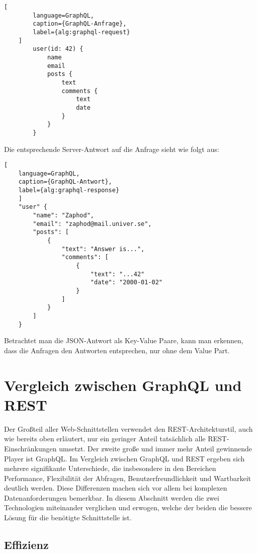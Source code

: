 \documentclass[draft,final]{vutinfth} %
\begin{document}
\begin{lstlisting}[
		language=GraphQL, 
		caption={GraphQL-Anfrage}, 
		label={alg:graphql-request}
	]
		user(id: 42) {
			name
			email
			posts {
				text
				comments {
					text
					date
				}
			}
		}
\end{lstlisting}

Die entsprechende Server-Antwort auf die Anfrage sieht wie folgt aus:

\begin{lstlisting}[
	language=GraphQL, 
	caption={GraphQL-Antwort}, 
	label={alg:graphql-response}
	]
	"user" {
		"name": "Zaphod",
		"email": "zaphod@mail.univer.se",
		"posts": [
			{
				"text": "Answer is...",
				"comments": [
					{
						"text": "...42"
						"date": "2000-01-02"
					}
				]
			}
		]
	}
\end{lstlisting}

Betrachtet man die JSON-Antwort als Key-Value Paare, kann man erkennen, dass die Anfragen den Antworten entsprechen, nur ohne dem Value Part.


\section{Vergleich zwischen GraphQL und REST}

Der Großteil aller Web-Schnittstellen verwendet den REST-Architekturstil, auch wie bereits oben erläutert, nur ein geringer Anteil tatsächlich alle REST-Einschränkungen umsetzt.
Der zweite große und immer mehr Anteil gewinnende Player ist GraphQL.
Im Vergleich zwischen GraphQL und REST ergeben sich mehrere signifikante Unterschiede, die insbesondere in den Bereichen Performance, Flexibilität der Abfragen, Benutzerfreundlichkeit und Wartbarkeit deutlich werden. 
Diese Differenzen machen sich vor allem bei komplexen Datenanforderungen bemerkbar.
In diesem Abschnitt werden die zwei Technologien miteinander verglichen und erwogen, welche der beiden die bessere Lösung für die benötigte Schnittstelle ist.


\subsection{Effizienz}
\end{document}
